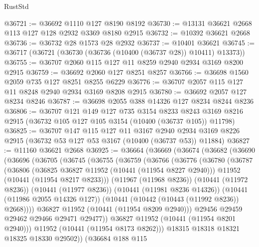 \begin{lexlean}{RustStd}
\begin{coremodule}
@36721 := @36692 @1110 @127 @8190 @8192
@36730 := @13131 @36621 @2668 @113 @127 @128 @2932 @3369 @8180 @2915
@36732 := @10392 @36621 @2668
@36736 := @36732 @28 @1573 @28 @2932
@36737 := @10401 @36621
@36745 := @36717 (@36721 (@36730 (@36736 (@10400 (@36737 @28)) @10411) @13373))
@36755 := @36707 @2060 @115 @127 @11 @8259 @2940 @2934 @3169 @8200 @2915
@36759 := @36692 @2060 @127 @8251 @8257
@36766 := @36698 @1560 @2059 @735 @127 @8251 @8255 @6229
@36776 := @36707 @2057 @115 @127 @11 @8248 @2940 @2934 @3169 @8208 @2915
@36780 := @36692 @2057 @127 @8234 @8246
@36787 := @36698 @2055 @388 @14326 @127 @8234 @8244 @8236
@36806 := @36707
    @121
    @149
    @127
    @735
    @3154
    @8233
    @8243
    @3169
    @8216
    @2915
    (@36732 @105 @127 @105 @3154 (@10400 (@36737 @105)) @11798)
@36825 := @36707
    @147
    @115
    @127
    @11
    @3167
    @2940
    @2934
    @3169
    @8226
    @2915
    (@36732 @53 @127 @53 @3167 (@10400 (@36737 @53)) @11884)
@36827 := @11160 @36621 @2668
@36925 := @36664
    (@36669
      (@36674
        (@36682
          (@36690
            (@36696
              (@36705
                (@36745
                  (@36755
                    (@36759
                      (@36766
                        (@36776
                          (@36780
                            (@36787
                              (@36806
                                (@36825 @36827 @11952 (@10441 (@11954 @8227 @2940)))
                                @11952
                                (@10441 (@11954 @8217 @8233)))
                              (@11967 (@11968 @8236))
                              (@10441 (@11972 @8236))
                              (@10441 (@11977 @8236))
                              (@10441 (@11981 @8236 @14326))
                              (@10441 (@11986 @2055 @14326 @127))
                              (@10441 (@10442 (@10443 (@11992 @8236)) @2668))))
                          @36827
                          @11952
                          (@10441 (@11954 @8209 @2940)))
                        @29456
                        @29459
                        @29462
                        @29466
                        @29471
                        @29477))
                    @36827
                    @11952
                    (@10441 (@11954 @8201 @2940)))
                  @11952
                  (@10441 (@11954 @8173 @8262)))
                @18315
                @18318
                @18321
                @18325
                @18330
                @29502))
            (@36684
              @188
              @115

\end{coremodule}
\end{lexlean}
